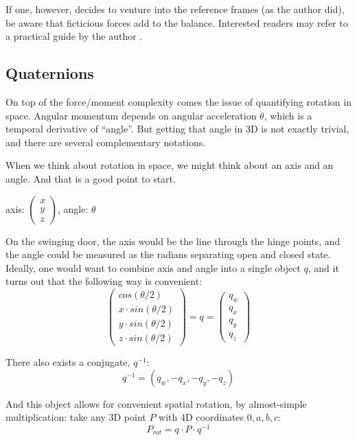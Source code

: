 If one, however, decides to venture into the reference frames (as the author did), be aware that ficticious forces add to the balance.
Interested readers may refer to a practical guide by the author \citep{Mielke2020wrenches}.


\subsection{Quaternions}
\label{sec:org4aca7d9}
On top of the force/moment complexity comes the issue of quantifying rotation in space.
Angular momentum depends on angular acceleration \(\ddot\theta\), which is a temporal derivative of ``angle''.
But getting that angle in 3D is not exactly trivial, and there are several complementary notations.


When we think about rotation in space, we might think about an axis and an angle.
And that is a good point to start.

\begin{center}
axis: \(\begin{pmatrix}x\\y\\z \end{pmatrix}\), angle: \(\theta\)
\end{center}

On the swinging door, the axis would be the line through the hinge points, and the angle could be measured as the radians separating open and closed state.
Ideally, one would want to combine axis and angle into a single object \(q\), and it turns out that the following way is convenient:
\begin{equation}\label{eqn:quaternion}
\begin{pmatrix}cos(\theta/2)\\x\cdot sin(\theta/2)\\y\cdot sin(\theta/2)\\z\cdot sin(\theta/2) \end{pmatrix} = q = \begin{pmatrix}q_w\\q_x\\q_y\\q_z \end{pmatrix}
\end{equation}

There also exists a conjugate, \(q^{-1}\):
\[q^{-1} = (q_w, -q_x, -q_y, -q_z)\]


And this object allows for convenient spatial rotation, by almost-simple multiplication:
take any 3D point \(P\) with 4D coordinates \(0, a, b, c\):
\[P_{rot} = q\cdot P\cdot q^{-1}\]

